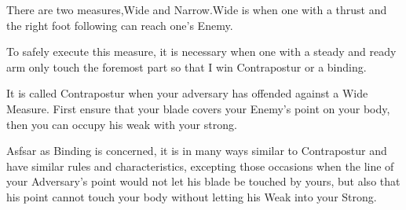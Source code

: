 \newpage


\newpage


 There are two measures,Wide and Narrow.Wide is when one with
 a thrust and the right foot following can reach one's Enemy.

To safely execute this measure, it is necessary when one with a steady and
ready arm only touch the foremost part so that I win Contrapostur or
a binding.

It is called Contrapostur when your adversary has offended against a
Wide Measure. First ensure that your blade covers your Enemy's point
on your body, then you can occupy his weak with your strong.

%

Asfsar as Binding is concerned, it is in many ways similar to Contrapostur
and have similar rules and characteristics, excepting those occasions
when the line of your Adversary's point would not let his blade be
touched by yours, but also that his point cannot touch your body
without letting his Weak into your Strong.


